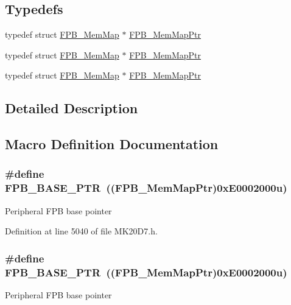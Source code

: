 \subsection*{Typedefs}
\begin{DoxyCompactItemize}
\item 
typedef struct \hyperlink{struct_f_p_b___mem_map}{F\+P\+B\+\_\+\+Mem\+Map} $\ast$ \hyperlink{group___f_p_b___peripheral_gaffb8b5a06bae98ff71e1337bfd371172}{F\+P\+B\+\_\+\+Mem\+Map\+Ptr}
\item 
typedef struct \hyperlink{struct_f_p_b___mem_map}{F\+P\+B\+\_\+\+Mem\+Map} $\ast$ \hyperlink{group___f_p_b___peripheral_gaffb8b5a06bae98ff71e1337bfd371172}{F\+P\+B\+\_\+\+Mem\+Map\+Ptr}
\item 
typedef struct \hyperlink{struct_f_p_b___mem_map}{F\+P\+B\+\_\+\+Mem\+Map} $\ast$ \hyperlink{group___f_p_b___peripheral_gaffb8b5a06bae98ff71e1337bfd371172}{F\+P\+B\+\_\+\+Mem\+Map\+Ptr}
\end{DoxyCompactItemize}


\subsection{Detailed Description}


\subsection{Macro Definition Documentation}
\subsubsection[{\texorpdfstring{F\+P\+B\+\_\+\+B\+A\+S\+E\+\_\+\+P\+TR}{FPB_BASE_PTR}}]{\setlength{\rightskip}{0pt plus 5cm}\#define F\+P\+B\+\_\+\+B\+A\+S\+E\+\_\+\+P\+TR~(({\bf F\+P\+B\+\_\+\+Mem\+Map\+Ptr})0x\+E0002000u)}\hypertarget{group___f_p_b___peripheral_ga95d994c97f967ce02339465def6bac95}{}\label{group___f_p_b___peripheral_ga95d994c97f967ce02339465def6bac95}
Peripheral F\+PB base pointer 

Definition at line 5040 of file M\+K20\+D7.\+h.

\subsubsection[{\texorpdfstring{F\+P\+B\+\_\+\+B\+A\+S\+E\+\_\+\+P\+TR}{FPB_BASE_PTR}}]{\setlength{\rightskip}{0pt plus 5cm}\#define F\+P\+B\+\_\+\+B\+A\+S\+E\+\_\+\+P\+TR~(({\bf F\+P\+B\+\_\+\+Mem\+Map\+Ptr})0x\+E0002000u)}\hypertarget{group___f_p_b___peripheral_ga95d994c97f967ce02339465def6bac95}{}\label{group___f_p_b___peripheral_ga95d994c97f967ce02339465def6bac95}
Peripheral F\+PB base pointer 

